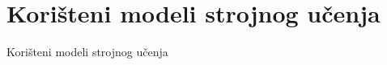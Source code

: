 \chapter{Korišteni modeli strojnog učenja}
\label{ch:koristeni-modeli-strojnog-ucenja}
Korišteni modeli strojnog učenja %
